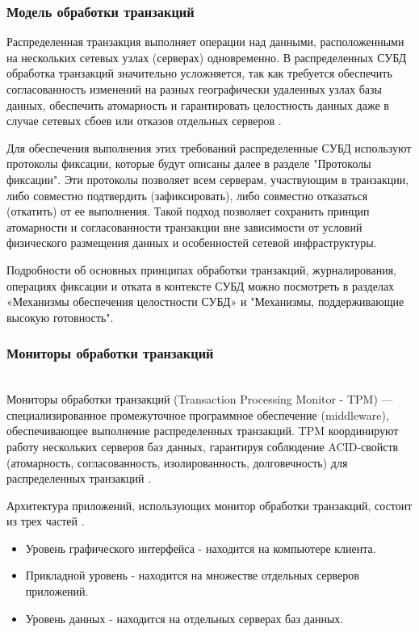 \subsubsection{Модель обработки транзакций}

Распределенная транзакция выполняет операции над данными, расположенными на нескольких сетевых узлах (серверах) одновременно. 
В распределенных СУБД обработка транзакций значительно усложняется, так как требуется обеспечить согласованность изменений на 
разных географически удаленных узлах базы данных, обеспечить атомарность и гарантировать целостность данных даже в случае сетевых 
сбоев или отказов отдельных серверов \autocite{Tanenbaum}.

Для обеспечения выполнения этих требований распределенные СУБД используют протоколы фиксации, которые будут описаны далее в разделе 
"Протоколы фиксации". Эти протоколы позволяет всем серверам, участвующим в транзакции, либо совместно подтвердить (зафиксировать), 
либо совместно отказаться (откатить) от ее выполнения. Такой подход позволяет сохранить принцип атомарности и согласованности транзакции 
вне зависимости от условий физического размещения данных и особенностей сетевой инфраструктуры.

Подробности об основных принципах обработки транзакций, журналирования, операциях фиксации и отката в контексте СУБД можно посмотреть 
в разделах «Механизмы обеспечения целостности СУБД» и "Механизмы, поддерживающие высокую готовность".

\subsubsection{Мониторы обработки транзакций}~\\

Мониторы обработки транзакций (Transaction Processing Monitor - TPM) — специализированное промежуточное программное обеспечение (middleware), 
обеспечивающее выполнение распределенных транзакций. TPM координируют работу нескольких серверов баз данных, гарантируя соблюдение ACID-свойств 
(атомарность, согласованность, изолированность, долговечность) для распределенных транзакций \autocite{TransactionMonitors}.

Архитектура приложений, использующих монитор обработки транзакций, состоит из трех частей \autocite{TPM}.

\begin{itemize}
    \item Уровень графического интерфейса - находится на компьютере клиента.
    \item Прикладной уровень - находится на множестве отдельных серверов приложений.
    \item Уровень данных - находится на отдельных серверах баз данных.
\end{itemize}

